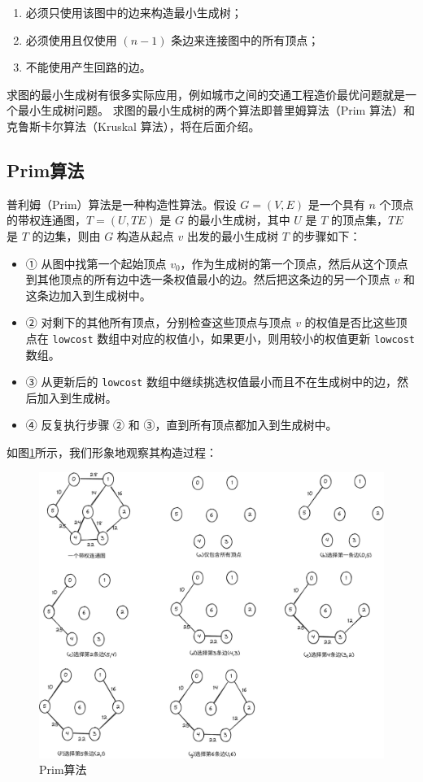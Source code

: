 \documentclass[lang=cn,newtx,10pt,scheme=chinese]{elegantbook}
\begin{document}
\begin{enumerate}
  \item 必须只使用该图中的边来构造最小生成树；
  \item 必须使用且仅使用 $(n-1)$ 条边来连接图中的所有顶点；
  \item 不能使用产生回路的边。
\end{enumerate}

求图的最小生成树有很多实际应用，例如城市之间的交通工程造价最优问题就是一个最小生成树问题。
求图的最小生成树的两个算法即普里姆算法（Prim 算法）和克鲁斯卡尔算法（Kruskal 算法），将在后面介绍。
\subsection{Prim算法}
普利姆（Prim）算法是一种构造性算法。假设 $G = (V, E)$ 是一个具有 $n$ 个顶点的带权连通图，$T = (U, TE)$ 是 $G$ 的最小生成树，其中 $U$ 是 $T$ 的顶点集，$TE$ 是 $T$ 的边集，则由 $G$ 构造从起点 $v$ 出发的最小生成树 $T$ 的步骤如下：

\begin{itemize}
  \item ① 从图中找第一个起始顶点 $v_0$，作为生成树的第一个顶点，然后从这个顶点到其他顶点的所有边中选一条权值最小的边。然后把这条边的另一个顶点 $v$ 和这条边加入到生成树中。
  \item ② 对剩下的其他所有顶点，分别检查这些顶点与顶点 $v$ 的权值是否比这些顶点在 \texttt{lowcost} 数组中对应的权值小，如果更小，则用较小的权值更新 \texttt{lowcost} 数组。
  \item ③ 从更新后的 \texttt{lowcost} 数组中继续挑选权值最小而且不在生成树中的边，然后加入到生成树。
  \item ④ 反复执行步骤 ② 和 ③，直到所有顶点都加入到生成树中。
\end{itemize}

如图\ref{fig:prim}所示，我们形象地观察其构造过程：



\begin{figure}[h!]
  \centering
  \includegraphics[width=1\textwidth]{./figure/pdf/cropped/prime.pdf}
  \caption{Prim算法}
  \label{fig:prim}
\end{figure}
\end{document}
